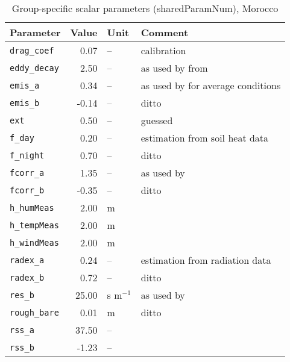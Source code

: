 \begin{table}[ht]
\centering
\caption{Group-specific scalar parameters (\textsf{sharedParamNum}), Morocco} 
\label{tab:moroccoMet_sharedParamNum}
\begin{tabular}{lrll}
  \hline
Parameter & Value & Unit & Comment \\ 
  \hline
\verb!drag_coef! & 0.07 & -- & calibration \\ 
  \verb!eddy_decay! & 2.50 & -- & as used by \citet{shuttleworth85} from \citet{monteith73} \\ 
  \verb!emis_a! & 0.34 & -- & as used by \citet{maidment93} for average conditions \\ 
  \verb!emis_b! & -0.14 & -- & ditto \\ 
  \verb!ext! & 0.50 & -- & guessed \\ 
  \verb!f_day! & 0.20 & -- & estimation from soil heat data \\ 
  \verb!f_night! & 0.70 & -- & ditto \\ 
  \verb!fcorr_a! & 1.35 & -- & as used by \citet{maidment93} \\ 
  \verb!fcorr_b! & -0.35 & -- & ditto \\ 
  \verb!h_humMeas! & 2.00 & m &  \\ 
  \verb!h_tempMeas! & 2.00 & m &  \\ 
  \verb!h_windMeas! & 2.00 & m &  \\ 
  \verb!radex_a! & 0.24 & -- & estimation from radiation data \\ 
  \verb!radex_b! & 0.72 & -- & ditto \\ 
  \verb!res_b! & 25.00 & s m$^{-1}$ & as used by \citet{shuttleworth85} \\ 
  \verb!rough_bare! & 0.01 & m & ditto \\ 
  \verb!rss_a! & 37.50 & -- &  \\ 
  \verb!rss_b! & -1.23 & -- &  \\ 
   \hline
\end{tabular}
\end{table}
